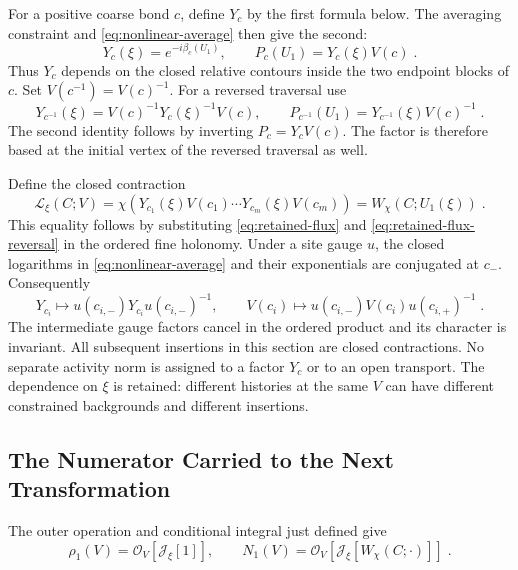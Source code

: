 \documentclass[11pt]{article}
\begin{document}
For a positive coarse bond $c$, define $Y_c$ by the first formula below. The averaging constraint and \eqref{eq:nonlinear-average} then give the second:
\begin{equation}\label{eq:retained-flux}
    Y_c(\xi)=e^{-i\beta_c(U_1)},
    \qquad P_c(U_1)=Y_c(\xi)V(c)\;.
\end{equation}
Thus $Y_c$ depends on the closed relative contours inside the two endpoint blocks of $c$. Set $V(c^{-1})=V(c)^{-1}$. For a reversed traversal use
\begin{equation}\label{eq:retained-flux-reversal}
    Y_{c^{-1}}(\xi)=V(c)^{-1}Y_c(\xi)^{-1}V(c),
    \qquad P_{c^{-1}}(U_1)=Y_{c^{-1}}(\xi)V(c)^{-1}\;.
\end{equation}
The second identity follows by inverting $P_c=Y_cV(c)$. The factor is therefore based at the initial vertex of the reversed traversal as well.

Define the closed contraction
\begin{equation}\label{eq:retained-loop-insertion}
    \mathcal L_\xi(C;V)
        =\chi\left(Y_{c_1}(\xi)V(c_1)
            \cdots Y_{c_m}(\xi)V(c_m)\right)
        =W_\chi(C;U_1(\xi))\;.
\end{equation}
This equality follows by substituting \eqref{eq:retained-flux} and \eqref{eq:retained-flux-reversal} in the ordered fine holonomy. Under a site gauge $u$, the closed logarithms in \eqref{eq:nonlinear-average} and their exponentials are conjugated at $c_-$. Consequently
\begin{equation}
    Y_{c_i}\longmapsto u(c_{i,-})Y_{c_i}u(c_{i,-})^{-1},
    \qquad V(c_i)\longmapsto
        u(c_{i,-})V(c_i)u(c_{i,+})^{-1}\;.
\end{equation}
The intermediate gauge factors cancel in the ordered product and its character is invariant. All subsequent insertions in this section are closed contractions. No separate activity norm is assigned to a factor $Y_c$ or to an open transport. The dependence on $\xi$ is retained: different histories at the same $V$ can have different constrained backgrounds and different insertions.

\subsection{The Numerator Carried to the Next Transformation}

The outer operation and conditional integral just defined give
\begin{equation}\label{eq:retained-conditional-law}
    \rho_1(V)=\mathcal O_V[\mathcal J_\xi[1]],
    \qquad N_1(V)=\mathcal O_V[\mathcal J_\xi[W_\chi(C;\cdot)]]\;.
\end{equation}
\end{document}
